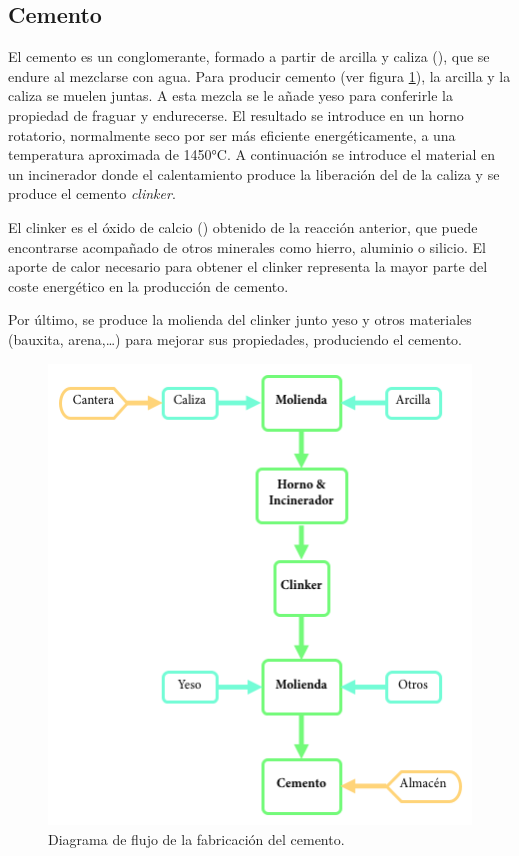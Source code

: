 \subsection{Cemento}
El cemento es un conglomerante, formado a partir de arcilla y caliza (), que se endure al mezclarse con agua. Para producir cemento (ver figura \ref{fig:cemento}), la arcilla y la caliza se muelen juntas. A esta mezcla se le añade yeso para conferirle la propiedad de fraguar y endurecerse. El resultado se introduce en un horno rotatorio, normalmente seco por ser más eficiente energéticamente, a una temperatura aproximada de 1450\si{\celsius}. A continuación se introduce el material en un incinerador donde el calentamiento produce la liberación del  de la caliza y se produce el cemento \emph{clinker}.

\begin{center}
\end{center}

El clinker es el óxido de calcio () obtenido de la reacción anterior, que puede encontrarse acompañado de otros minerales como hierro, aluminio o silicio. El aporte de calor necesario para obtener el clinker representa la mayor parte del coste energético en la producción de cemento.

Por último, se produce la molienda del clinker junto yeso y otros materiales (bauxita, arena,\ldots) para mejorar sus propiedades, produciendo el cemento.

\begin{figure}[!htb]
\centering
\includegraphics[width=12cm]{cemento.png}
\caption{Diagrama de flujo de la fabricación del cemento.}
\label{fig:cemento}
\end{figure}

